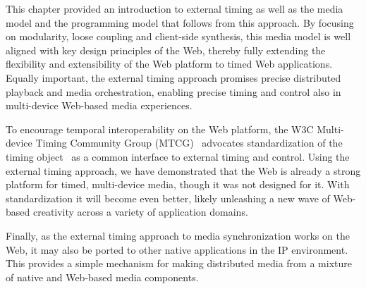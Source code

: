 \documentclass[graybox]{svmult}
\begin{document}
This chapter provided an introduction to external timing as well as the media
model and the programming model that follows from this approach. By focusing
on modularity, loose coupling and client-side synthesis, this media model is
well aligned with key design principles of the Web, thereby fully extending
the flexibility and extensibility of the Web platform to timed Web
applications. Equally important, the external timing approach promises
precise distributed playback and media orchestration, enabling precise timing
and control also in multi-device Web-based media experiences.

To encourage temporal interoperability on the Web platform, the W3C Multi-
device Timing Community Group (MTCG)~\cite{mtcg} advocates standardization of
the timing object~\cite{timingobject} as a common interface to external timing
and control. Using the external timing approach, we have demonstrated that the
Web is already a strong platform for timed, multi-device media, though it was
not designed for it. With standardization it will become even better, likely
unleashing a new wave of Web-based creativity across a variety of application
domains.

Finally, as the external timing approach to media synchronization works on the
Web, it may also be ported to other native applications in the IP environment.
This provides a simple mechanism for making distributed media from a mixture
of native and Web-based media components.


\newpage

 
\end{document}
